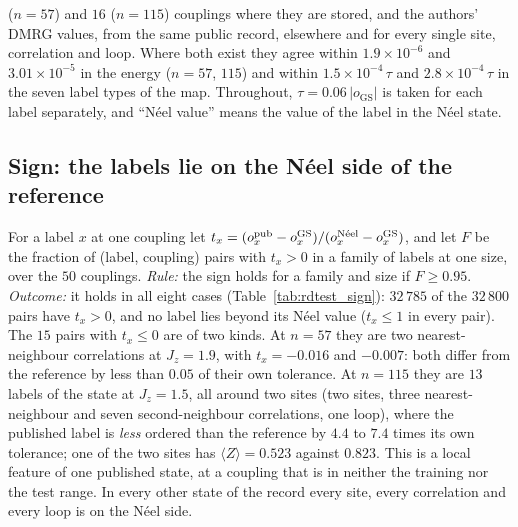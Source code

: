 \documentclass[aps,prx,onecolumn,10pt,nofootinbib,longbibliography,floatfix]{revtex4-2}
\theoremstyle{remark}
\newcommand{\Jz}{J_z}
\newcommand{\GS}{\mathrm{GS}}
\begin{document}
($n=57$) and $16$ ($n=115$) couplings where they are stored, and the authors' DMRG values, from the same public %
record, elsewhere and for every single site, correlation and loop. Where both exist they agree within
$1.9\times10^{-6}$ and $3.01\times10^{-5}$ in the energy ($n=57$, $115$) and within $1.5\times10^{-4}\,\tau$ and %
$2.8\times10^{-4}\,\tau$ in the seven label types of the map. Throughout, $\tau=0.06\,|o_{\GS}|$ is taken for each %
label separately, and ``N\'eel value'' means the value of the label in the N\'eel state.

\subsection{Sign: the labels lie on the N\'eel side of the reference}
For a label $x$ at one coupling let $t_x=(o_x^{\rm pub}-o_x^{\GS})/(o_x^{\text{N\'eel}}-o_x^{\GS})$, and let $F$ be
the fraction of (label, coupling) pairs with $t_x>0$ in a family of labels at one size, over the $50$ couplings. %
\emph{Rule:} the sign holds for a family and size if $F\ge0.95$. \emph{Outcome:} it holds in all eight cases %
(Table~\ref{tab:rdtest_sign}): $32\,785$ of the $32\,800$ pairs have $t_x>0$, and no label lies beyond its N\'eel %
value ($t_x\le1$ in every pair). The $15$ pairs with $t_x\le0$ are of two kinds. At $n=57$ they are two %
nearest-neighbour correlations at $\Jz=1.9$, with $t_x=-0.016$ and $-0.007$: both differ from the reference by less %
than $0.05$ of their own tolerance. At $n=115$ they are $13$ labels of the state at $\Jz=1.5$, all around two sites %
(two sites, three nearest-neighbour and seven second-neighbour correlations, one loop), where the published label is
\emph{less} ordered than the reference by $4.4$ to $7.4$ times its own tolerance; one of the two sites has %
$\langle Z\rangle=0.523$ against $0.823$. This is a local feature of one published state, at a coupling that is in %
neither the training nor the test range. In every other state of the record every site, every correlation and every
loop is on the N\'eel side.
\end{document}
